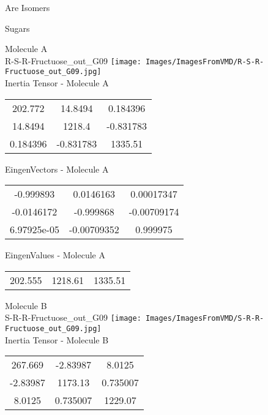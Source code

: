 \begin{center}
\vtab
\vtab
\textcolor{NavyBlue}{\Large Are Isomers}
\end{center}
\newpage

\vtab[-2cm]
\begin{center}
{\large Sugars}
\end{center}
\begin{multicols}{2}
\begin{center}
Molecule A \\ 
R-S-R-Fructuose\_out\_G09
\texttt{[image: Images/ImagesFromVMD/R-S-R-Fructuose\_out\_G09.jpg]}
\\
Inertia Tensor - Molecule A \\
\vtab
\begin{tabular}{|c c c|}
202.772	 & 	14.8494	 & 	0.184396	 \\
14.8494	 & 	1218.4	 & 	-0.831783	 \\
0.184396	 & 	-0.831783	 & 	1335.51
\end{tabular}

\vtab
 EingenVectors - Molecule A     \\
\vtab
\begin{tabular}{|c c c|}
-0.999893	 & 	0.0146163	 & 	0.00017347	 \\
-0.0146172	 & 	-0.999868	 & 	-0.00709174	 \\
6.97925e-05	 & 	-0.00709352	 & 	0.999975
\end{tabular}

\vtab
 EingenValues - Molecule A     \\
\vtab
\begin{tabular}{|c c c|}
202.555	 & 	1218.61	 & 	1335.51
\end{tabular}
\columnbreak

Molecule B \\ 
S-R-R-Fructuose\_out\_G09
\texttt{[image: Images/ImagesFromVMD/S-R-R-Fructuose\_out\_G09.jpg]}
\\
Inertia Tensor - Molecule B \\
\vtab
\begin{tabular}{|c c c|}
267.669	 & 	-2.83987	 & 	8.0125	 \\
-2.83987	 & 	1173.13	 & 	0.735007	 \\
8.0125	 & 	0.735007	 & 	1229.07
\end{tabular}


\end{center}
\end{multicols}
